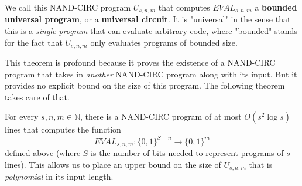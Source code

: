   \begin{definition}
  We call this NAND-CIRC program $U_{s, n, m}$ that computes $EVAL_{s, n, m}$ a \textbf{bounded universal program}, or a \textbf{universal circuit}. It is "universal" in the sense that this is a \textit{single program} that can evaluate arbitrary code, where "bounded" stands for the fact that $U_{s, n, m}$ only evaluates programs of bounded size. 
  \end{definition}

  This theorem is profound because it proves the existence of a NAND-CIRC program that takes in \textit{another} NAND-CIRC program along with its input. But it provides no explicit bound on the size of this program. The following theorem takes care of that. 

  \begin{theorem}
  For every $s, n, m \in \mathbb{N}$, there is a NAND-CIRC program of at most $O(s^2 \log s)$ lines that computes the function 
  \[EVAL_{s, n, m}: \{0,1\}^{S+n} \longrightarrow \{0,1\}^m\]
  defined above (where $S$ is the number of bits needed to represent programs of $s$ lines). This allows us to place an upper bound on the size of $U_{s, n, m}$ that is \textit{polynomial} in its input length. 
  \end{theorem}


